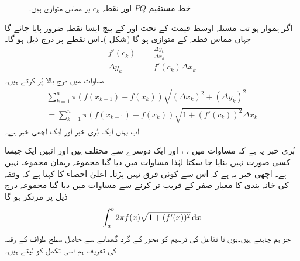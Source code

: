 \begin{figure}
\begin{minipage}{0.40\textwidth}
\caption{خط مستقیم $PQ$ اور نقطہ $c_k$ پر مماس متوازی ہیں۔}
\label{شکل_تکمل_استعمال_مماس_متوازی_لکیر}
\end{minipage}\hfill
\end{figure}


اگر  ہموار ہو تب مسئلہ اوسط قیمت کے تحت  اور  کے بیچ ایسا نقطہ  ضرور پایا جائے گا جہاں مماس قطعہ  کے متوازی ہو گا (شکل )۔اس نقطے پر درج ذیل ہو گا۔
\begin{align*}
f'(c_k)&=\frac{\Delta y_k}{\Delta x_k}\\
\Delta y_k&=f'(c_k)\Delta x_k
\end{align*} 
مساوات  میں درج بالا  پُر کرتے ہیں۔
\begin{multline}\label{مساوات_تکمل_استعمال_سطحی_رقبہ_ب}
\sum_{k=1}^n \pi(f(x_{k-1})+f(x_k))\sqrt{(\Delta x_k)^2+(\Delta y_k)^2}\\
=\sum_{k=1}^n\pi(f(x_{k-1})+f(x_k))\sqrt{1+(f'(c_k))^2}\Delta x_k
\end{multline}
اب یہاں ایک بُری خبر اور ایک اچھی خبر ہے۔

بُری خبر یہ ہے کہ مساوات  میں  ، ،   اور  ایک دوسرے سے مختلف ہیں اور انہیں ایک  جیسا کسی صورت نہیں بنایا جا سکتا   لہٰذا مساوات  میں دیا گیا مجموعہ  ریمان مجموعہ نہیں ہے۔ اچھی خبر یہ ہے کہ اس سے کوئی فرق نہیں پڑتا۔ اعلیٰ احصاء کا   کہتا ہے کہ وقفہ  کی خانہ بندی کا معیار صفر کے قریب تر کرنے  سے مساوات  میں دیا گیا مجموعہ درج ذیل پر مرتکز ہو گا
\begin{align*}
\int_a^b2\pi f(x)\sqrt{1+(f'(x))^2}\dif x
\end{align*} 
جو ہم چاہتے ہیں۔یوں   تا  تفاعل  کی ترسیم کو محور  کے گرد گھمانے سے حاصل سطح طواف کے رقبہ کی تعریف ہم اسی تکمل کو لیتے ہیں۔

